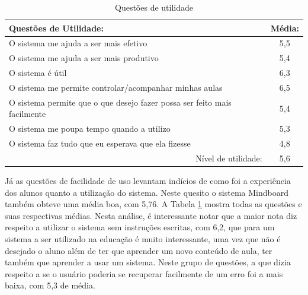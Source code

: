 \begin{table}[]
\centering
\caption{Questões de utilidade}
\label{tab:use_utilidade}
\begin{tabular}{@{}|l|c|@{}}
\hline
Questões de Utilidade:                                                   & \multicolumn{1}{l|}{Média:} \\ \hline
O sistema me ajuda a ser mais efetivo                                    & 5,5                         \\ \hline
O sistema me ajuda a ser mais produtivo                                  & 5,4                         \\ \hline
O sistema é útil                                                         & 6,3                            \\ \hline
O sistema me permite controlar/acompanhar minhas aulas                   & 6,5                            \\ \hline
O sistema permite que o que desejo fazer possa ser feito mais facilmente & 5,4                            \\ \hline
O sistema me poupa tempo quando a utilizo                                & 5,3                            \\ \hline
O sistema faz tudo que eu esperava que ela fizesse                       & 4,8                             \\ \hline
\multicolumn{1}{|r|}{Nível de utilidade:}                                & 5,6      \\ \hline
\end{tabular}
\end{table}

Já as questões de facilidade de uso levantam indícios de como foi a experiência dos alunos quanto a utilização do sistema. Neste quesito o sistema Mindboard também obteve uma média boa, com 5,76. A Tabela \ref{tab:use_utilidade} mostra todas as questões e suas respectivas médias.
Nesta análise, é interessante notar que a maior nota diz respeito a utilizar o sistema sem instruções escritas, com 6,2, que para um sistema a ser utilizado na educação é muito interessante, uma vez que não é desejado o aluno além de ter que aprender um novo conteúdo de aula, ter também que aprender a usar um sistema. Neste grupo de questões, a que dizia respeito a se o usuário poderia se recuperar facilmente de um erro foi a mais baixa, com 5,3 de média.


